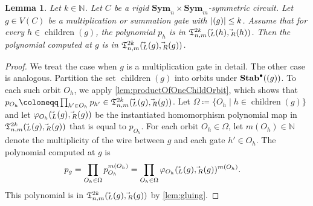 \documentclass[11pt, DIV=15]{scrarticle}
\theoremstyle{definition}
\theoremstyle{plain}
\newtheorem{lemma}[definition]{Lemma}
\theoremstyle{remark}
\renewcommand{\phi}{\varphi}
\newcommand{\Sym}{\mathbf{Sym}}
\newcommand{\Stab}{\mathbf{Stab}}
\newcommand{\StabP}{\Stab^{\bullet}}
\DeclareMathOperator{\child}{children}
\newcommand{\bbN}{\mathbb{N}}
\let\sup\relax
\DeclareMathOperator{\sup}{sup}
\begin{document}
 	 \begin{lemma}
 		\label{lem:productOfAllChildOrbits}
 		Let $k \in \bbN$. 
 		Let $C$ be a rigid $\Sym_{n} \times \Sym_{m}$-symmetric circuit. 
 		Let $g \in V(C)$ be a multiplication or summation gate with $|\sup(g)| \leq k$.
 		Assume that for every $h \in \child(g)$, the polynomial $p_h$ is in $\mathfrak{T}_{n,m}^{2k}(\vec{\sup}_L(h), \vec{\sup}_R(h))$.
 		Then the polynomial computed at $g$ is in $\mathfrak{T}_{n,m}^{2k}(\vec{\sup}_L(g), \vec{\sup}_R(g))$.
 	\end{lemma}	
 	\begin{proof}
 		We treat the case when $g$ is a multiplication gate in detail.
 		The other case is analogous.
 		Partition the set $\child(g)$ into orbits under $\StabP(\sup(g))$. 
		To each such orbit $O_h$, we apply \cref{lem:productOfOneChildOrbit}, 
		which shows that $p_{O_h} \coloneqq \prod_{h' \in O_h} p_{h'} \in \mathfrak{T}^{2k}_{n,m}(\vec{\sup}_L(g), \vec{\sup}_R(g))$.
		Let $\Omega \coloneqq \{O_h \mid h \in \child(g)\}$ and let $\phi_{O_h}(\vec{\sup}_L(g), \vec{\sup}_R(g))$ be the instantiated homomorphism polynomial map in $\mathfrak{T}^{2k}_{n,m}(\vec{\sup}_L(g), \vec{\sup}_R(g))$ that is equal to $p_{O_h}$. For each orbit $O_h \in \Omega$, let $m(O_h) \in \bbN$ denote the multiplicity of the wire between $g$ and each gate $h' \in O_h$.
 		The polynomial computed at $g$ is 
 		\begin{align*}
 			p_g = \prod_{O_h \in \Omega} p_{O_h}^{m(O_h)} &= \prod_{O_h \in \Omega} \phi_{O_h}(\vec{\sup}_L(g), \vec{\sup}_R(g))^{m(O_h)}.
 		\end{align*}	
 		This polynomial is in $\mathfrak{T}_{n,m}^{2k}(\vec{\sup}_L(g), \vec{\sup}_R(g))$ by \cref{lem:gluing}.
 	\end{proof}	
 	
\end{document}
